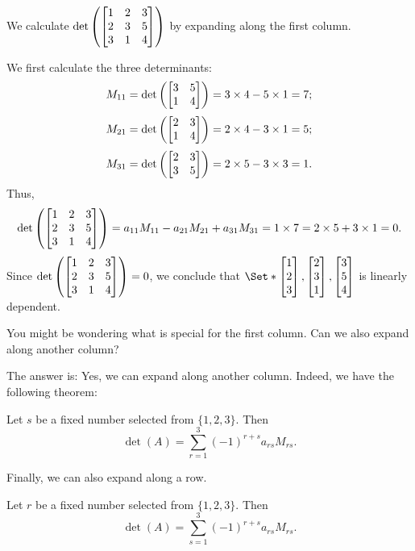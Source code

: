 \begin{example}
	We calculate $\det\left(\mat{1 & 2 & 3 \\ 2 & 3 & 5 \\ 3 & 1 & 4}\right)$ by expanding along
	the first column.

	We first calculate the three determinants:
	\[
		M_{11}=\det\left(\mat{3 & 5 \\ 1 & 4}\right)=3\times 4 - 5\times 1=7;
	\]
	\[
		M_{21}=\det\left(\mat{2 & 3 \\ 1 & 4}\right)=2\times 4 - 3\times 1=5;
	\]
	\[
		M_{31}=\det\left(\mat{2 & 3 \\ 3 & 5}\right)=2\times 5 - 3\times 3=1.
	\]
	Thus,
	\[
		\det\left(\mat{1 & 2 & 3 \\ 2 & 3 & 5 \\ 3 & 1 & 4}\right)=a_{11}M_{11}-a_{21}M_{21}+a_{31}M_{31}=1\times 7=2\times 5+3\times 1=0.
	\]
	Since $\det\left(\mat{1 & 2 & 3 \\ 2 & 3 & 5 \\ 3 & 1 & 4}\right)=0$, we conclude that
	$\Set*{\mat{1 \\ 2 \\ 3},\mat{2 \\ 3 \\ 1},\mat{3\\ 5 \\4}}$ is linearly
	dependent.
\end{example}

You might be wondering what is special for the first column. Can we also expand
along another column?

The answer is: Yes, we can expand along another column. Indeed, we have the
following theorem:
\begin{theorem}
	Let $s$ be a fixed number selected from $\{1,2,3\}$. Then
	\[
		\det(A)=\sum_{r=1}^{3}(-1)^{r+s}a_{rs}M_{rs}.
	\]
\end{theorem}

Finally, we can also expand along a row.
\begin{theorem}
	Let $r$ be a fixed number selected from $\{1,2,3\}$. Then
	\[
		\det(A)=\sum_{s=1}^{3}(-1)^{r+s}a_{rs}M_{rs}.
	\]
\end{theorem}


